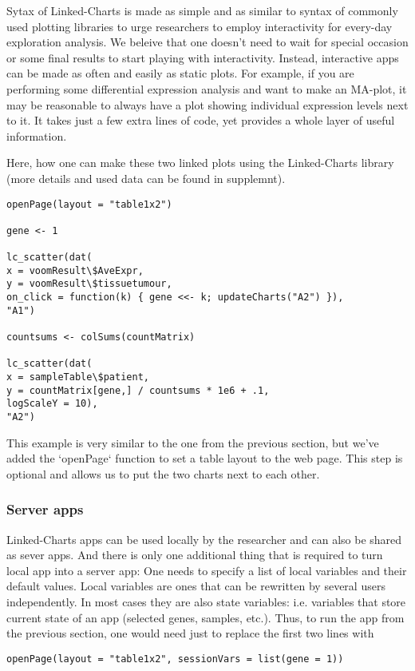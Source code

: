 \documentclass[twocolumn,10pt]{article}
\begin{document}
Sytax of Linked-Charts is made as simple and as similar to syntax of commonly used plotting libraries to urge researchers to employ interactivity for every-day exploration analysis. We beleive that one doesn't need to wait for special occasion or some final results to start playing with interactivity. Instead, interactive apps can be made as often and easily as static plots. For example, if you are performing some differential expression analysis and want to make an MA-plot, it may be reasonable to always have a plot showing individual expression levels next to it. It takes just a few extra lines of code, yet provides a whole layer of useful information.

Here, how one can make these two linked plots using the Linked-Charts library (more details and used data can be found in supplemnt).

\begin{verbatim}
openPage(layout = "table1x2")

gene <- 1

lc_scatter(dat(
x = voomResult\$AveExpr,
y = voomResult\$tissuetumour,
on_click = function(k) { gene <<- k; updateCharts("A2") }),
"A1")

countsums <- colSums(countMatrix)

lc_scatter(dat(
x = sampleTable\$patient,
y = countMatrix[gene,] / countsums * 1e6 + .1,
logScaleY = 10),
"A2")
\end{verbatim}

This example is very similar to the one from the previous section, but we've added the `openPage` function to set a table layout to the web page. This step is optional and allows us to put the two charts next to each other.

\subsubsection{Server apps}
Linked-Charts apps can be used locally by the researcher and can also be shared as sever apps. And there is only one additional thing that is required to turn local app into a server app: One needs to specify a list of local variables and their default values. Local variables are ones that can be rewritten by several users independently. In most cases they are also state variables: i.e. variables that store current state of an app (selected genes, samples, etc.). Thus, to run the app from the previous section, one would need just to replace the first two lines with
\begin{verbatim}
openPage(layout = "table1x2", sessionVars = list(gene = 1))
\end{verbatim}
\end{document}

